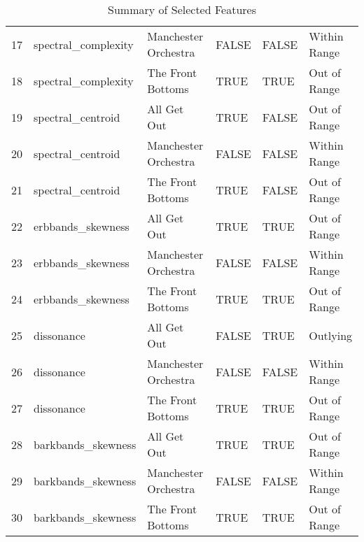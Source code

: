 \documentclass{article}\usepackage[]{graphicx}\usepackage[]{xcolor}
\begin{document}
\begin{table}[ht]
\begin{tabular}{rlllll}
  17 & spectral\_complexity & Manchester Orchestra & FALSE & FALSE & Within Range \\ 
  18 & spectral\_complexity & The Front Bottoms & TRUE & TRUE & Out of Range \\ 
  19 & spectral\_centroid & All Get Out & TRUE & FALSE & Out of Range \\ 
  20 & spectral\_centroid & Manchester Orchestra & FALSE & FALSE & Within Range \\ 
  21 & spectral\_centroid & The Front Bottoms & TRUE & FALSE & Out of Range \\ 
  22 & erbbands\_skewness & All Get Out & TRUE & TRUE & Out of Range \\ 
  23 & erbbands\_skewness & Manchester Orchestra & FALSE & FALSE & Within Range \\ 
  24 & erbbands\_skewness & The Front Bottoms & TRUE & TRUE & Out of Range \\ 
  25 & dissonance & All Get Out & FALSE & TRUE & Outlying \\ 
  26 & dissonance & Manchester Orchestra & FALSE & FALSE & Within Range \\ 
  27 & dissonance & The Front Bottoms & TRUE & TRUE & Out of Range \\ 
  28 & barkbands\_skewness & All Get Out & TRUE & TRUE & Out of Range \\ 
  29 & barkbands\_skewness & Manchester Orchestra & FALSE & FALSE & Within Range \\ 
  30 & barkbands\_skewness & The Front Bottoms & TRUE & TRUE & Out of Range \\ 
   \hline
\end{tabular}
\endgroup
\caption{Summary of Selected Features} 
\end{table}
\end{document}
